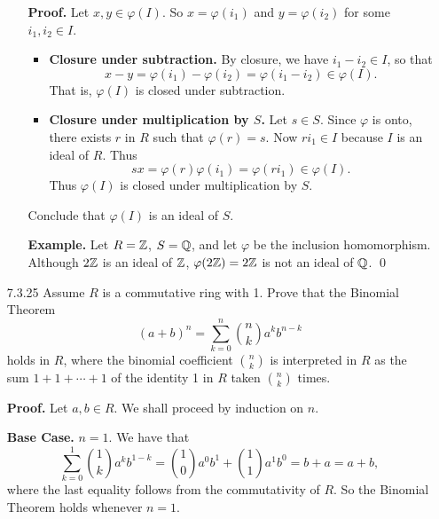 \begin{enumerate}
\begin{enumerate}
               \textbf{Proof.} Let $x, y \in \varphi(I)$. So $x = \varphi(i_1)$
               and $y = \varphi(i_2)$ for some $i_1, i_2 \in I$.
               \begin{itemize}
                  \item \textbf{Closure under subtraction.} By closure, we have
                        $i_1 - i_2 \in I$, so that
                        $$x - y = \varphi(i_1)-\varphi(i_2) =
                          \varphi(i_1 - i_2)\in \varphi(I).$$
                        That is, $\varphi(I)$ is closed under subtraction.
                  \item \textbf{Closure under multiplication by $S$.} Let
                        $s \in S$. Since $\varphi$ is onto, there exists $r$ in
                        $R$ such that $\varphi(r) = s$. Now $ri_1 \in I$
                        because $I$ is an ideal of $R$. Thus
                        $$sx = \varphi(r)\varphi(i_1) =
                          \varphi(ri_1) \in \varphi(I).$$
                        Thus $\varphi(I)$ is closed under multiplication by $S$.
               \end{itemize}

               Conclude that $\varphi(I)$ is an ideal of $S$.

               \textbf{Example.} Let $R = \mathbb{Z}$, $S = \mathbb{Q}$, and let $\varphi$ be
               the inclusion homomorphism. Although $2\mathbb{Z}$ is an ideal of $\mathbb{Z}$,
               $\varphi(2\mathbb{Z}) = 2\mathbb{Z}$ is not an ideal of $\mathbb{Q}$. \qed
      \end{enumerate}
   \item[7.3.25]  Assume $R$ is a commutative ring with 1. Prove that the
                  Binomial Theorem
                  $$(a + b)^n = \sum_{k=0}^n\binom{n}{k}a^kb^{n-k}$$
                  holds in $R$, where the binomial coefficient $\binom{n}{k}$ is
                  interpreted in $R$ as the sum $1 + 1 + \cdots + 1$ of the
                  identity 1 in $R$ taken $\binom{n}{k}$ times.

      \textbf{Proof.} Let $a, b \in R$. We shall proceed by induction on $n$.

      \textbf{Base Case.} $n = 1$.  We have that
      $$
         \sum_{k=0}^1\binom{1}{k}a^kb^{1-k} = \binom{1}{0}a^0b^1 +
            \binom{1}{1}a^1b^0 = b + a = a + b,
      $$
      where the last equality follows from the commutativity of $R$. So the
      Binomial Theorem holds whenever $n = 1$.


\end{enumerate}
